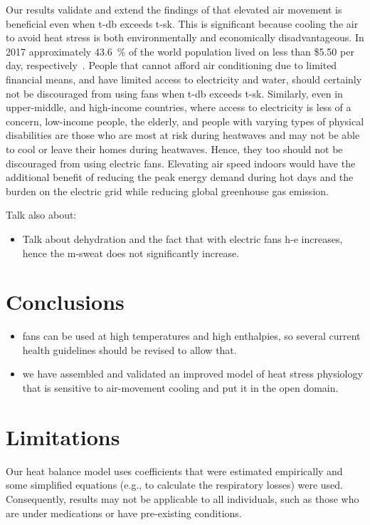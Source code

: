 Our results validate and extend the findings of  that elevated air movement is beneficial even when \ac{t-db} exceeds \acf{t-sk}.
This is significant because cooling the air to avoid heat stress is both environmentally and economically disadvantageous.
In 2017 approximately 43.6~\% of the world population lived on less than \$5.50 per day, respectively~\cite{PovertyO1:online}.
People that cannot afford air conditioning due to limited financial means, and have limited access to electricity and water, should certainly not be discouraged from using fans when \ac{t-db} exceeds \ac{t-sk}.
Similarly, even in upper-middle, and high-income countries, where access to electricity is less of a concern, low-income people, the elderly, and people with varying types of physical disabilities are those who are most at risk during heatwaves and may not be able to cool or leave their homes during heatwaves.
Hence, they too should not be discouraged from using electric fans.
Elevating air speed indoors would have the additional benefit of reducing the peak energy demand during hot days and the burden on the electric grid while reducing global greenhouse gas emission.

Talk also about:
\begin{itemize}
    \item Talk about dehydration and the fact that with electric fans \ac{h-e} increases, hence the \ac{m-sweat} does not significantly increase.
\end{itemize}

\section{Conclusions}\label{sec:conclusions}
\begin{itemize}
    \item fans can be used at high temperatures and high enthalpies, so several current health guidelines should be revised to allow that.
    \item we have assembled and validated an improved model of heat stress physiology that is sensitive to air-movement cooling and put it in the open domain.
\end{itemize}


\section*{Limitations}
Our heat balance model uses coefficients that were estimated empirically and some simplified equations (e.g., to calculate the respiratory losses) were used.
Consequently, results may not be applicable to all individuals, such as those who are under medications or have pre-existing conditions.
